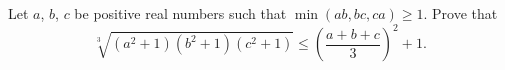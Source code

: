 Let $a$, $b$, $c$ be positive real numbers such that $\min\left(ab,bc,ca\right)\geq1$. Prove that \[\sqrt[3]{\left(a^2+1\right)\left(b^2+1\right)\left(c^2+1\right)}\leq\left(\frac{a+b+c}{3}\right)^2+1.\]
